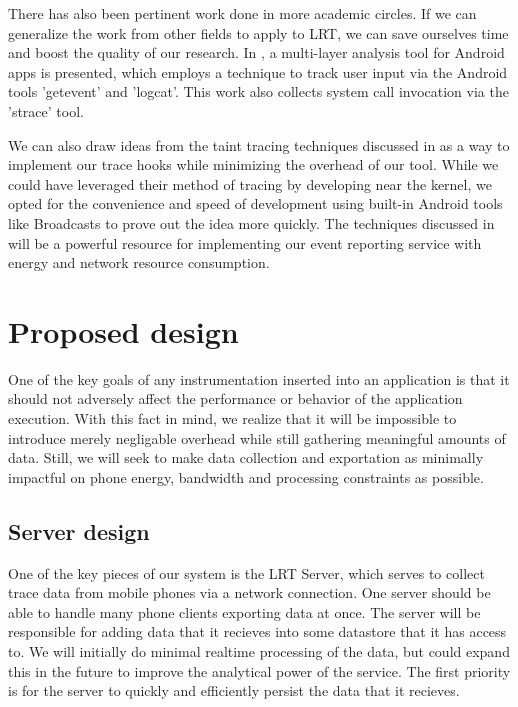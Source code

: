 \documentclass{acm_proc_article-sp}
\begin{document}
There has also been pertinent work done in more academic circles. If we can 
generalize the work from other fields to apply to LRT, we can save ourselves 
time and boost the quality of our research. In \cite{ProfileDroid}, a 
multi-layer analysis tool for Android apps is presented, which employs a 
technique to track user input via the Android tools 'getevent' and 'logcat'. 
This work also collects system call invocation via the 'strace' tool. 

We can also draw ideas from the taint tracing techniques discussed in 
\cite{TaintDroid} as a way to implement our trace hooks while minimizing 
the overhead of our tool. While we could have leveraged their method of 
tracing by developing near the kernel, we opted for the convenience and 
speed of development using built-in Android tools like Broadcasts to prove
out the idea more quickly. The techniques discussed in \cite{PeriodicTransfers}
will be a powerful resource for implementing our event reporting service 
with energy and network resource consumption.

\section{Proposed design}
One of the key goals of any instrumentation inserted into an application is 
that it should not adversely affect the performance or behavior of the 
application execution. With this fact in mind, we realize that it will be 
impossible to introduce merely negligable overhead while still gathering
meaningful amounts of data. Still, we will seek to make data collection
and exportation as minimally impactful on phone energy, bandwidth and processing
constraints as possible.

\subsection{Server design}
One of the key pieces of our system is the LRT Server, which serves
to collect trace data from mobile phones via a network connection.
One server should be able to handle many phone clients exporting data at once.
The server will be responsible for adding data that it recieves into
some datastore that it has access to. We will initially do minimal realtime
processing of the data, but could expand this in the future to improve the
analytical power of the service. The first priority is for the server to quickly
and efficiently persist the data that it recieves.
\end{document}
